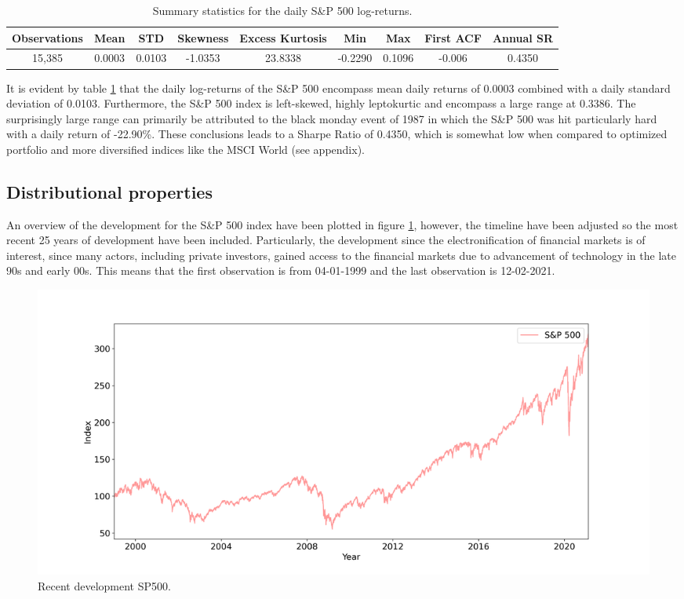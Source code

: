 \begin{table}[H]
\caption{Summary statistics for the daily S\&P 500 log-returns.}
\centering
\begin{tabular}{c c c c c c c c c} 
\hline\hline
Observations & Mean & STD & Skewness & Excess Kurtosis & Min & Max & First ACF & Annual SR \\
\hline
15,385 & 0.0003 & 0.0103 & -1.0353 & 23.8338 & -0.2290 & 0.1096 & -0.006 & 0.4350 \\
\hline
\end{tabular}
\label{tab:summary_stats_S&P500}
\end{table}
 
It is evident by table \ref{tab:summary_stats_S&P500} that the daily log-returns of the S\&P 500 encompass mean daily returns of 0.0003 combined with a daily standard deviation of 0.0103. Furthermore, the S\&P 500 index is left-skewed, highly leptokurtic and encompass a large range at 0.3386. The surprisingly large range can primarily be attributed to the black monday event of 1987 in which the S\&P 500 was hit particularly hard with a daily return of -22.90\%. These conclusions leads to a Sharpe Ratio of 0.4350, which is somewhat low when compared to optimized portfolio and more diversified indices like the MSCI World (see appendix).

\subsection{Distributional properties} An overview of the development for the S\&P 500 index have been plotted in figure \ref{fig: all_indices_index}, however, the timeline have been adjusted so the most recent 25 years of development have been included. Particularly, the development since the electronification of financial markets is of interest, since many actors, including private investors, gained access to the financial markets due to advancement of technology in the late 90s and early 00s. This means that the first observation is from 04-01-1999 and the last observation is 12-02-2021. 
\begin{figure}[H] 
    \centering
    \includegraphics[width=1.0\textwidth]{analysis/data_description/images/adjusted SP500.png}
    \caption{Recent development SP500.}
    \label{fig: all_indices_index} 
\end{figure}

